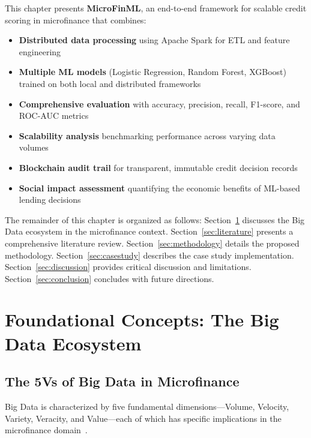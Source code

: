 \documentclass[runningheads]{llncs}
\begin{document}
This chapter presents \textbf{MicroFinML}, an end-to-end framework for scalable credit scoring in microfinance that combines:
\begin{itemize}
    \item \textbf{Distributed data processing} using Apache Spark for ETL and feature engineering
    \item \textbf{Multiple ML models} (Logistic Regression, Random Forest, XGBoost) trained on both local and distributed frameworks
    \item \textbf{Comprehensive evaluation} with accuracy, precision, recall, F1-score, and ROC-AUC metrics
    \item \textbf{Scalability analysis} benchmarking performance across varying data volumes
    \item \textbf{Blockchain audit trail} for transparent, immutable credit decision records
    \item \textbf{Social impact assessment} quantifying the economic benefits of ML-based lending decisions
\end{itemize}

The remainder of this chapter is organized as follows: Section~\ref{sec:bigdata} discusses the Big Data ecosystem in the microfinance context. Section~\ref{sec:literature} presents a comprehensive literature review. Section~\ref{sec:methodology} details the proposed methodology. Section~\ref{sec:casestudy} describes the case study implementation. Section~\ref{sec:discussion} provides critical discussion and limitations. Section~\ref{sec:conclusion} concludes with future directions.



\section{Foundational Concepts: The Big Data Ecosystem}
\label{sec:bigdata}

\subsection{The 5Vs of Big Data in Microfinance}

Big Data is characterized by five fundamental dimensions---Volume, Velocity, Variety, Veracity, and Value---each of which has specific implications in the microfinance domain~\cite{chen2014bigdata, sivarajah2017bigdata}.
\end{document}
